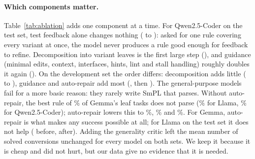 \paragraph{Which components matter.} Table~\ref{tab:ablation} adds one component at a time. For Qwen2.5-Coder on
the test set, test feedback alone changes nothing (\testAblQwenCoderOneShot{} to \testAblQwenCoderFeedback):
asked for one rule covering every variant at once, the model never produces a rule good enough for feedback to
refine. Decomposition into variant leaves is the first large step (\testAblQwenCoderDecomp), and guidance (minimal
edits, context, interfaces, hints, lint and stall handling) roughly doubles it again
(\testAblQwenCoderGuidance). On the development set the order differs: decomposition adds little
(\devAblQwenCoderFeedback{} to \devAblQwenCoderDecomp), guidance and auto-repair add most
(\devAblQwenCoderGuidance, then \devAblQwenCoderRepair). The general-purpose models fail for a more basic reason:
they rarely write SmPL that parses. Without auto-repair, the best rule of \parseFailGemmaNoFix\% of Gemma's leaf
tasks does not parse (\parseFailLlamaNoFix\% for Llama, \parseFailQwenCoderNoFix\% for Qwen2.5-Coder); auto-repair
lowers this to \parseFailGemmaFix\%, \parseFailLlamaFix\% and \parseFailQwenCoderFix\%. For Gemma, auto-repair
is what makes any success possible at all; for Llama on the test set it does not help (\testAblLlamaGuidance{}
before, \testAblLlamaRepair{} after). Adding the generality critic left the mean number of solved conversions
unchanged for every model on both sets. We keep it because it is cheap and did not hurt, but our data give no
evidence that it is needed.

\begin{table}[t]
\centering
\caption{Precision of the outputs on buildable targets (local models: mean over seeds). \emph{Changed}: targets
the rule edits; \emph{Divergent}: the rule makes an edit the human did not make; \emph{Broken}: the output matches
the human fix (exactly or as a subset) but does not compile; \emph{Precision}: solved / changed.}
\label{tab:safety}
\footnotesize
\setlength{\tabcolsep}{5pt}

\end{table}

